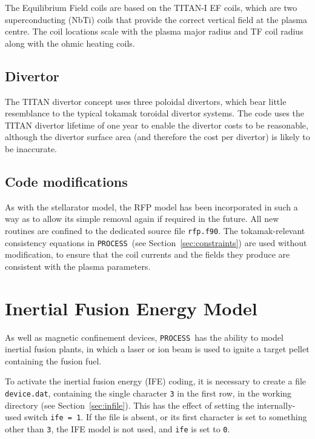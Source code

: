 \documentclass[11pt,a4paper]{report}
\newcommand{\process}{\mbox{\texttt{PROCESS}}}
\begin{document}
The Equilibrium Field coils are based on the TITAN-I EF coils, which are two
superconducting (NbTi) coils that provide the correct vertical field at the
plasma centre. The coil locations scale with the plasma major radius and TF
coil radius along with the ohmic heating coils.

\subsection{Divertor}

The TITAN divertor concept uses three poloidal divertors, which bear little
resemblance to the typical tokamak toroidal divertor systems. The code uses
the TITAN divertor lifetime of one year to enable the divertor costs to be
reasonable, although the divertor surface area (and therefore the cost per
divertor) is likely to be inaccurate.

\subsection{Code modifications}

As with the stellarator model, the RFP model has been incorporated in such a
way as to allow its simple removal again if required in the future. All new
routines are confined to the dedicated source file \texttt{rfp.f90}. The
tokamak-relevant consistency equations in \process\ (see
Section~\ref{sec:constraints}) are used without modification, to ensure that
the coil currents and the fields they produce are consistent with the plasma
parameters.

\section{Inertial Fusion Energy Model}
\label{sec:ife}

As well as magnetic confinement devices, \process\ has the ability to model
inertial fusion plants, in which a laser or ion beam is used to ignite a
target pellet containing the fusion fuel.

To activate the inertial fusion energy (IFE) coding, it is necessary to create
a file \texttt{device.dat}, containing the single character \texttt{3} in the
first row, in the working directory (see Section~\ref{sec:infile}). This has
the effect of setting the internally-used switch \texttt{ife = 1}. If the file
is absent, or its first character is set to something other than \texttt{3},
the IFE model is not used, and \texttt{ife} is set to \texttt{0}.
\end{document}
